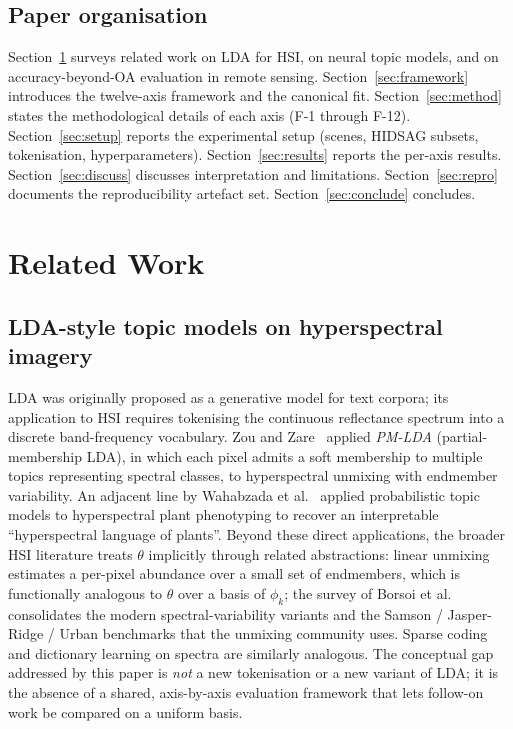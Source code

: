 \documentclass[journal,a4paper,10pt]{IEEEtran}
\begin{document}
\subsection{Paper organisation}

Section~\ref{sec:related} surveys related work on LDA for HSI, on
neural topic models, and on accuracy-beyond-OA evaluation in remote
sensing. Section~\ref{sec:framework} introduces the twelve-axis
framework and the canonical fit. Section~\ref{sec:method} states the
methodological details of each axis (F-1 through F-12).
Section~\ref{sec:setup} reports the experimental setup (scenes,
HIDSAG subsets, tokenisation, hyperparameters).
Section~\ref{sec:results} reports the per-axis results.
Section~\ref{sec:discuss} discusses interpretation and
limitations. Section~\ref{sec:repro} documents the reproducibility
artefact set. Section~\ref{sec:conclude} concludes.

\section{Related Work}
\label{sec:related}

\subsection{LDA-style topic models on hyperspectral imagery}

LDA \cite{blei2003lda} was originally proposed as a generative model
for text corpora; its application to HSI requires tokenising the
continuous reflectance spectrum into a discrete band-frequency
vocabulary. Zou and Zare~\cite{zou2017pmlda} applied \emph{PM-LDA}
(partial-membership LDA), in which each pixel admits a soft membership
to multiple topics representing spectral classes, to hyperspectral
unmixing with endmember variability. An adjacent line by Wahabzada et
al.~\cite{wahabzada2015plant} applied probabilistic topic models to
hyperspectral plant phenotyping to recover an interpretable
``hyperspectral language of plants''. Beyond these direct
applications, the broader
HSI literature treats $\theta$ implicitly through related abstractions:
linear unmixing \cite{nascimento2005vca,bioucasdias2012unmixing,borsoi2021variability}
estimates a per-pixel abundance over a small set of endmembers,
which is functionally analogous to $\theta$ over a basis of
$\phi_k$; the survey of Borsoi et
al.~\cite{borsoi2021variability} consolidates the modern
spectral-variability variants and the Samson / Jasper-Ridge / Urban
benchmarks that the unmixing community uses. Sparse coding and
dictionary learning on spectra are similarly analogous. The conceptual gap addressed by this paper is
\emph{not} a new tokenisation or a new variant of LDA; it is the
absence of a shared, axis-by-axis evaluation framework that lets
follow-on work be compared on a uniform basis.
\end{document}
